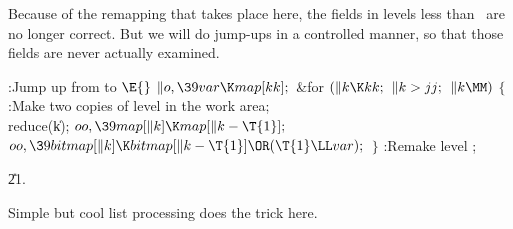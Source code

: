 Because of the remapping that takes place here, the  fields
in levels less than~ are no longer correct. But we will do
jump-ups in a controlled manner, so that those  fields are
never actually examined.

\Y\B\4:Jump up from  to \X${}\E{}$\6
$\|o,\39\\{var}\K\\{map}[\\{kk}];{}$\6
\&{for} ${}(\|k\K\\{kk};{}$ ${}\|k>\\{jj};{}$ ${}\|k\MM){}$\5
${}\{{}$\1\6
:Make two copies of level  in the work area\X;\6
\\{reduce}(\|k);\6
${}\\{oo},\39\\{map}[\|k]\K\\{map}[\|k-\T{1}];{}$\6
${}\\{oo},\39\\{bitmap}[\|k]\K\\{bitmap}[\|k-\T{1}]\OR(\T{1}\LL\\{var});{}$\6
\4${}\}{}$\2\6
:Remake level \X;\par
\U21.\fi

Simple but cool list processing does the trick here.

